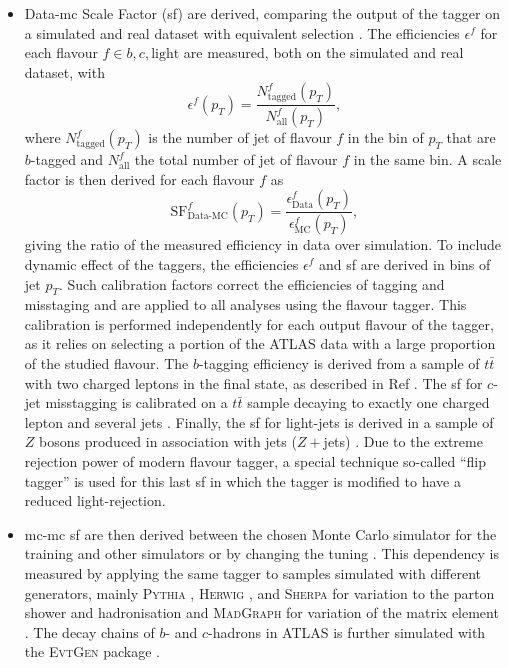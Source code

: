 \begin{itemize}
  \item Data-\gls{mc} Scale Factor (\gls{sf}) are derived, comparing the output of the tagger on a simulated and real dataset with equivalent selection \cite{Aad:2019aic, ATLAS-CONF-2018-045, ATLAS-CONF-2018-006, cjettaggingCalib}. The efficiencies $\epsilon^f$ for each flavour $f \in {b, c, \textrm{light}}$ are measured, both on the simulated and real dataset, with \[\epsilon^f(p_T) = \frac{N^f_{\textrm{tagged}}(p_T)}{N^f_{\textrm{all}}(p_T)},\] where $N^f_{\textrm{tagged}}(p_T)$ is the number of jet of flavour $f$ in the bin of $p_T$ that are $b$-tagged and $N^f_{\textrm{all}}$ the total number of jet of flavour $f$ in the same bin. A scale factor is then derived for each flavour $f$ as \[\textrm{SF}^f_{\textrm{Data-MC}}(p_T) = \frac{\epsilon^f_{\textrm{Data}}(p_T)}{\epsilon^f_{\textrm{MC}}(p_T)},\] giving the ratio of the measured efficiency in data over simulation. To include dynamic effect of the taggers, the efficiencies $\epsilon^f$ and \gls{sf} are derived in bins of jet $p_T$. Such calibration factors correct the efficiencies of tagging and misstaging and are applied to all analyses using the flavour tagger. This calibration is performed independently for each output flavour of the tagger, as it relies on selecting a portion of the ATLAS data with a large proportion of the studied flavour. The $b$-tagging efficiency is derived from a sample of $t\bar{t}$ with two charged leptons in the final state, as described in Ref \cite{Aad:2019aic}. The \gls{sf} for $c$-jet misstagging is calibrated on a $t\bar{t}$ sample decaying to exactly one charged lepton and several jets \cite{cjettaggingCalib}. Finally, the \gls{sf} for light-jets is derived in a sample of $Z$ bosons produced in association with jets ($Z+$jets) \cite{ATLAS:2023lwk}. Due to the extreme rejection power of modern flavour tagger, a special technique so-called ``flip tagger'' is used for this last \gls{sf} in which the tagger is modified to have a reduced light-rejection.
  \item \gls{mc}-\gls{mc} \gls{sf} are then derived between the chosen Monte Carlo simulator for the training and other simulators or by changing the tuning \cite{ATL-PHYS-PUB-2020-009}. This dependency is measured by applying the same tagger to samples simulated with different generators, mainly \textsc{Pythia} \cite{SJOSTRAND2015159}, \textsc{Herwig} \cite{bellm2017herwig}, and \textsc{Sherpa} \cite{sherpa2.2paper} for variation to the parton shower and hadronisation and \textsc{MadGraph} for variation of the matrix element \cite{madgraph}. The decay chains of $b$- and $c$-hadrons in ATLAS is further simulated with the \textsc{EvtGen} package \cite{LANGE2001152}. 

\end{itemize}
